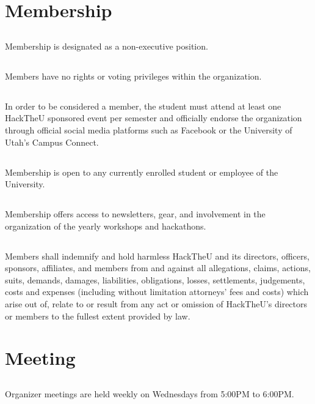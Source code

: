\documentclass[12pt]{article}
\begin{document}
\section{Membership}

\subsection{} Membership is designated as a non-executive position.
\subsection{} Members have no rights or voting privileges within the organization.
\subsection{} In order to be considered a member,
the student must attend at least one HackTheU sponsored event per semester and officially
endorse the organization through official social media platforms such as
Facebook or the University of Utah's Campus Connect.
\subsection{} Membership is open to any currently enrolled student or employee of the University.
\subsection{} Membership offers access to newsletters, gear, and involvement in the organization of the yearly workshops and hackathons.
\subsection{} Members shall indemnify and hold harmless HackTheU and its directors, officers, sponsors, 
affiliates, and members from and against all allegations, claims, actions, suits,
demands, damages, liabilities, obligations, losses, settlements, judgements, costs
and expenses (including without limitation attorneys' fees and costs) which arise out of, 
relate to or result from any act or omission of HackTheU's directors or members to the fullest extent provided by law.

\section{Meeting}

\subsection{} Organizer meetings are held weekly on Wednesdays from 5:00PM to 6:00PM.
\end{document}
